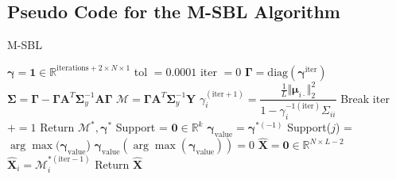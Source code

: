 \subsection{Pseudo Code for the M-SBL Algorithm}
\begin{algorithm}[H]
\caption{M-SBL}
\begin{algorithmic}[1]
\State $\boldsymbol{\gamma} = \mathbf{1} \in \mathbb{R}^{\text{iterations} + 2 \times N \times 1}$
\State tol $=0.0001$
\State iter $= 0$
	\State $\boldsymbol{\Gamma} = \text{diag}(\boldsymbol{\gamma}^\text{iter})$
	\State $\boldsymbol{\Sigma} = \boldsymbol{\Gamma} - \boldsymbol{\Gamma} \mathbf{A}^T \boldsymbol{\Sigma}_y^{-1} \mathbf{A} \boldsymbol{\Gamma}$
	\State $\mathcal{M} = \boldsymbol{\Gamma} \mathbf{A}^T \boldsymbol{\Sigma}_y^{-1} \mathbf{Y}$
		\State $\gamma_i^{(\text{iter} + 1)} = \dfrac{\frac{1}{L} \Vert \boldsymbol{\mu}_{i \cdot} \Vert_2^2}{1 - \gamma_i^{-1 (\text{iter})} \Sigma_{ii}}$
	\EndFor
		\State Break
	\EndIf
	\State iter $+= 1$
\EndWhile
\State Return $\mathcal{M}^\ast, \boldsymbol{\gamma}^\ast$
\EndProcedure
{}
\State Support = $\mathbf{0} \in \mathbb{R}^{k}$
\State $\boldsymbol{\gamma}_{\text{value}} = \boldsymbol{\gamma}^{\ast (-1)}$
		\State Support($j$) = $\arg \max (\boldsymbol{\gamma}_{\text{value}}$)
		\State $\boldsymbol{\gamma}_{\text{value}}(\arg \max (\boldsymbol{\gamma}_{\text{value}})) = 0$
	\EndIf
\EndFor
\State $\hat{\mathbf{X}} = \mathbf{0} \in \mathbb{R}^{N \times L-2}$
	\State $\hat{\mathbf{X}}_i = \mathcal{M}^{\ast(\text{iter} - 1)}_i$
\EndFor
\State Return $\hat{\mathbf{X}}$
\EndProcedure
\end{algorithmic}
\end{algorithm}

